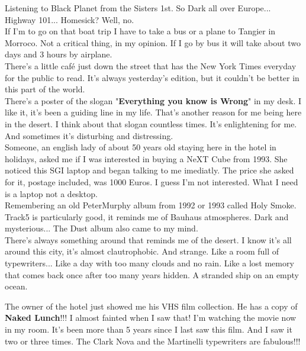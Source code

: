 \documentclass[11pt,twoside,a4paper]{book}
\begin{document}
\begin{multicols*}{2}
Listening to Black Planet from the Sisters 1st. So Dark all over Europe... Highway 101... Homesick? Well, no. ~\\

If I'm to go on that boat trip I have to take a bus or a plane to Tangier in Morroco. Not a critical thing, in my opinion. If I go by bus it will take about two days and 3 hours by airplane. ~\\

There's a little caf{\'e} just down the street that has the New York Times everyday for the public to read. It's always yesterday's edition, but it couldn't be better in this part of the world. ~\\

There's a poster of the slogan "\textbf{Everything you know is Wrong}" in my desk. I like it, it's been a guiding line in my life. That's another reason for me being here in the desert. I think about that slogan countless times. It's enlightening for me. And sometimes it's disturbing and distressing. ~\\

Someone, an english lady of about 50 years old staying here in the hotel in holidays, asked me if I was interested in buying a NeXT Cube from 1993. She noticed this SGI laptop and began talking to me imediatly. The price she asked for it, postage included, was 1000 Euros. I guess I'm not interested. What I need is a laptop not a desktop. ~\\

Remembering an old PeterMurphy album from 1992 or 1993 called Holy Smoke. Track5 is particularly good, it reminds me of Bauhaus atmospheres. Dark and mysterious... The Dust album also came to my mind. ~\\

There's always something around that reminds me of the desert. I know it's all around this city, it's almost clautrophobic. And strange. Like a room full of typewriters... Like a day with too many clouds and no rain. Like a lost memory that comes back once after too many years hidden. A stranded ship on an empty ocean. ~\\

\vfill
\columnbreak

The owner of the hotel just showed me his VHS film collection. He has a copy of \textbf{Naked Lunch}!!! I almost fainted when I saw that! I'm watching the movie now in my room. It's been more than 5 years since I last saw this film. And I saw it two or three times. The Clark Nova and the Martinelli typewriters are fabulous!!! ~\\


\end{multicols*}
\end{document}
